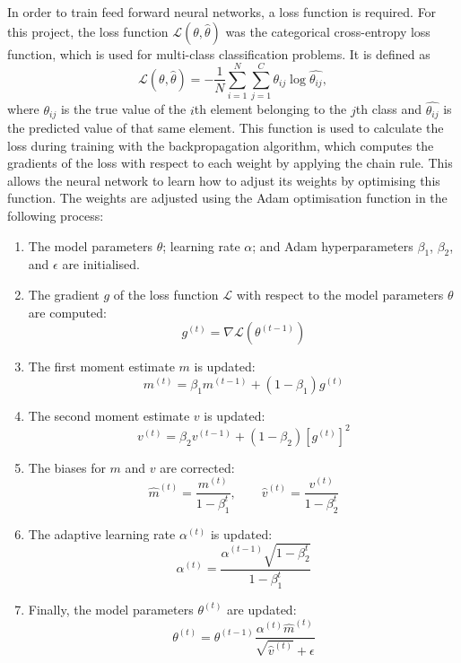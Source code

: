 \documentclass[11pt,a4paper]{article}
\begin{document}
In order to train feed forward neural networks, a loss function is required. For this project, the loss function $\mathcal{L} (\theta, \hat{\theta})$ was the categorical cross-entropy loss function, which is used for multi-class classification problems. It is defined as
\begin{equation}
    \mathcal{L}(\theta, \hat{\theta}) = - \frac{1}{N}\sum^N_{i=1}\sum^C_{j=1} \theta_{ij} \log{\hat{\theta_{ij}}},
    \label{eq:loss}
\end{equation}
where $\theta_{ij}$ is the true value of the $i$th element belonging to the $j$th class and $\hat{\theta_{ij}}$ is the predicted value of that same element. This function is used to calculate the loss during training with the backpropagation algorithm, which computes the gradients of the loss with respect to each weight by applying the chain rule. This allows the neural network to learn how to adjust its weights by optimising this function. The weights are adjusted using the Adam optimisation function in the following process:

\begin{enumerate}
    \item The model parameters $\theta$; learning rate $\alpha$; and Adam hyperparameters $\beta_1$, $\beta_2$, and $\epsilon$ are initialised.
    \item The gradient $g$ of the loss function $\mathcal{L}$ with respect to the model parameters $\theta$ are computed:
        \begin{equation}
            g^{(t)} = \nabla \mathcal{L}(\theta^{(t-1)})
        \end{equation}
    \item The first moment estimate $m$ is updated:
        \begin{equation}
            m^{(t)} = \beta_1 m^{(t-1)} + (1-\beta_1)g^{(t)}
        \end{equation}
    \item The second moment estimate $v$ is updated:
        \begin{equation}
            v^{(t)} = \beta_2 v^{(t-1)} + (1-\beta_2)[g^{(t)}]^2
        \end{equation}
    \item The biases for $m$ and $v$ are corrected:
        \begin{equation}
            \hat{m}^{(t)} = \frac{m^{(t)}}{1-\beta^t_1}, \qquad
            \hat{v}^{(t)} = \frac{v^{(t)}}{1-\beta^t_2}
        \end{equation}
    \item The adaptive learning rate $\alpha^{(t)}$ is updated:
        \begin{equation}
            \alpha^{(t)} = \frac{\alpha^{(t-1)}\sqrt{1-\beta^t_2}}{1-\beta^t_1}
        \end{equation}
    \item Finally, the model parameters $\theta^{(t)}$ are updated:
        \begin{equation}
            \theta^{(t)} = \theta^{(t-1)}\frac{\alpha^{(t)}\hat{m}^{(t)}}{\sqrt{\hat{v}^{(t)}} + \epsilon}
        \end{equation}
\end{enumerate}
\end{document}
